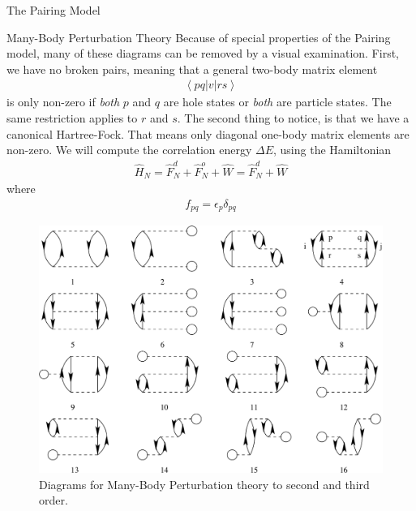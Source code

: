 \documentclass[twoside,english]{uiofysmaster}
\begin{document}
\begin{chapter}{The Pairing Model}
\begin{section}{Many-Body Perturbation Theory}
		Because of special properties of the Pairing model, many of these diagrams can be removed by a visual examination. First, we have no broken pairs, meaning that a general two-body matrix element 
		\begin{align}
			\left< pq | v | rs \right> 
		\end{align}
		is only non-zero if \textit{both} $p$ and $q$ are hole states or \textit{both} are particle states. The same restriction applies to $r$ and $s$. The second thing to notice, is that we have a canonical Hartree-Fock. That means only diagonal one-body matrix elements are non-zero. We will compute the correlation energy $\Delta E$, using the Hamiltonian
		\begin{align}
			\hat H_N = \hat F_N^d + \hat F_N^o + \hat W = \hat F_N^d + \hat W
		\end{align}
		where
		\begin{align}
			f_{pq} = \epsilon_p \delta_{pq}
		\end{align}
 		\begin{figure}[H]
			\includegraphics[width=\textwidth]{Figures/FirstSecondThirdOrder.pdf}
			\caption{Diagrams for Many-Body Perturbation theory to second and third order. }
			\label{mbpt23}
		\end{figure}


\end{section}
\end{chapter}
\end{document}
